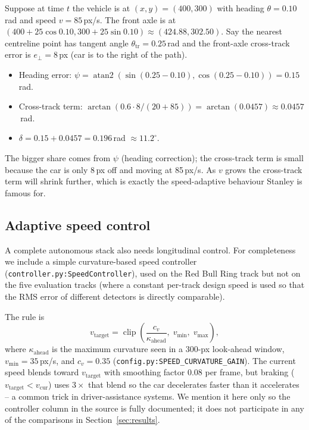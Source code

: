 \begin{example}
Suppose at time $t$ the vehicle is at $(x,y)=(400,300)$ with heading
$\theta=0.10$\,rad and speed $v=85$\,px/s. The front axle is at
$(400+25\cos 0.10, 300+25\sin 0.10)\approx(424.88, 302.50)$. Say the
nearest centreline point has tangent angle $\theta_{\text{tr}}=0.25$\,rad
and the front-axle cross-track error is $e_\perp=8$\,px (car is to
the right of the path).
\begin{itemize}[leftmargin=1.4em,itemsep=2pt]
  \item Heading error: $\psi = \operatorname{atan2}(\sin(0.25-0.10),\cos(0.25-0.10)) = 0.15$\,rad.
  \item Cross-track term: $\arctan(0.6\cdot 8/(20+85)) = \arctan(0.0457)\approx 0.0457$\,rad.
  \item $\delta = 0.15 + 0.0457 = 0.196$\,rad $\approx 11.2^\circ$.
\end{itemize}
The bigger share comes from $\psi$ (heading correction); the
cross-track term is small because the car is only 8\,px off and moving
at 85\,px/s. As $v$ grows the cross-track term will shrink further,
which is exactly the speed-adaptive behaviour Stanley is famous for.
\end{example}

\subsection{Adaptive speed control}

A complete autonomous stack also needs longitudinal control. For
completeness we include a simple curvature-based speed controller
(\texttt{controller.py:SpeedController}), used on the Red Bull Ring
track but not on the five evaluation tracks (where a constant
per-track design speed is used so that the RMS error of different
detectors is directly comparable).

The rule is
\[
v_{\text{target}} = \operatorname{clip}\!\left(\frac{c_v}{\kappa_{\text{ahead}}},\;v_{\min},\;v_{\max}\right),
\]
where $\kappa_{\text{ahead}}$ is the maximum curvature seen in a
300-px look-ahead window, $v_{\min}=35$\,px/s, and $c_v=0.35$
(\texttt{config.py:SPEED\_CURVATURE\_GAIN}). The current speed blends
toward $v_{\text{target}}$ with smoothing factor $0.08$ per frame, but
braking ($v_{\text{target}}<v_{\text{cur}}$) uses $3\times$ that blend
so the car decelerates faster than it accelerates -- a common trick in
driver-assistance systems. We mention it here only so the controller
column in the source is fully documented; it does not participate in
any of the comparisons in Section~\ref{sec:results}.

